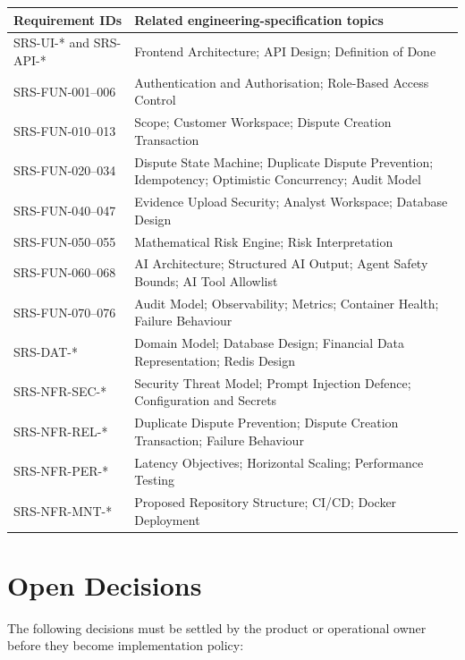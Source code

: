 \documentclass[11pt,a4paper]{article}
\begin{document}
\begin{longtable}{@{}p{}p{}@{}}
\textbf{Requirement IDs} & \textbf{Related engineering-specification topics} \\
\hline
SRS-UI-* and SRS-API-* & Frontend Architecture; API Design; Definition of Done \\
SRS-FUN-001--006 & Authentication and Authorisation; Role-Based Access Control \\
SRS-FUN-010--013 & Scope; Customer Workspace; Dispute Creation Transaction \\
SRS-FUN-020--034 & Dispute State Machine; Duplicate Dispute Prevention; Idempotency; Optimistic Concurrency; Audit Model \\
SRS-FUN-040--047 & Evidence Upload Security; Analyst Workspace; Database Design \\
SRS-FUN-050--055 & Mathematical Risk Engine; Risk Interpretation \\
SRS-FUN-060--068 & AI Architecture; Structured AI Output; Agent Safety Bounds; AI Tool Allowlist \\
SRS-FUN-070--076 & Audit Model; Observability; Metrics; Container Health; Failure Behaviour \\
SRS-DAT-* & Domain Model; Database Design; Financial Data Representation; Redis Design \\
SRS-NFR-SEC-* & Security Threat Model; Prompt Injection Defence; Configuration and Secrets \\
SRS-NFR-REL-* & Duplicate Dispute Prevention; Dispute Creation Transaction; Failure Behaviour \\
SRS-NFR-PER-* & Latency Objectives; Horizontal Scaling; Performance Testing \\
SRS-NFR-MNT-* & Proposed Repository Structure; CI/CD; Docker Deployment \\
\end{longtable}

\section{Open Decisions}

The following decisions must be settled by the product or operational
owner before they become implementation policy:
\end{document}
